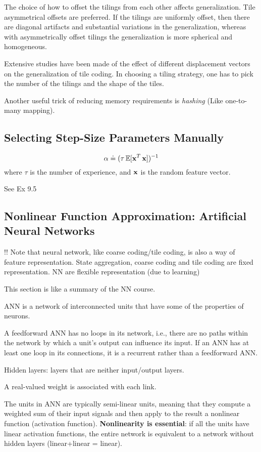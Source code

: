 \documentclass[sutton_barto_notes.tex]{subfiles}
\begin{document}
The choice of how to offset the tilings from each other affects generalization. Tile asymmetrical offsets are preferred. If the tilings are uniformly offset, then there are diagonal artifacts and substantial variations in the generalization, whereas with asymmetrically offset tilings the generalization is more spherical and homogeneous.

Extensive studies have been made of the effect of different displacement vectors on the generalization of tile coding.
In choosing a tiling strategy, one has to pick the number of the tilings and the shape of the tiles.

Another useful trick of reducing memory requirements is \textit{hashing} (Like one-to-many mapping).

\subsection{Selecting Step-Size Parameters Manually}

$$ \alpha \doteq (\tau \operatorname*{\mathbb{E}} [ {\operatorname*{\mathbf{x}}}^T \operatorname*{\mathbf{x}}] )^{-1} $$
where $\tau$ is the number of experience, and $\operatorname*{\mathbf{x}}$ is the random feature vector.

See Ex 9.5

\subsection{Nonlinear Function Approximation: Artificial Neural Networks}

!! Note that neural network, like coarse coding/tile coding, is also a way of feature representation. State aggregation, coarse coding and tile coding are fixed representation. NN are flexible representation (due to learning)

This section is like a summary of the NN course. 

ANN is a network of interconnected units that have some of the properties of neurons.

A feedforward ANN has no loops in its network, i.e., there are no paths within the network by which a unit's output can influence its input. If an ANN has at least one loop in its connections, it is a recurrent rather than a feedforward ANN.

Hidden layers: layers that are neither input/output layers.

A real-valued weight is associated with each link.

The units in ANN are typically semi-linear units, meaning that they compute a weighted sum of their input signals and then apply to the result a nonlinear function (activation function). \textbf{Nonlinearity is essential}: if all the units have linear activation functions, the entire network is equivalent to a network without hidden layers (linear+linear = linear).
\end{document}
